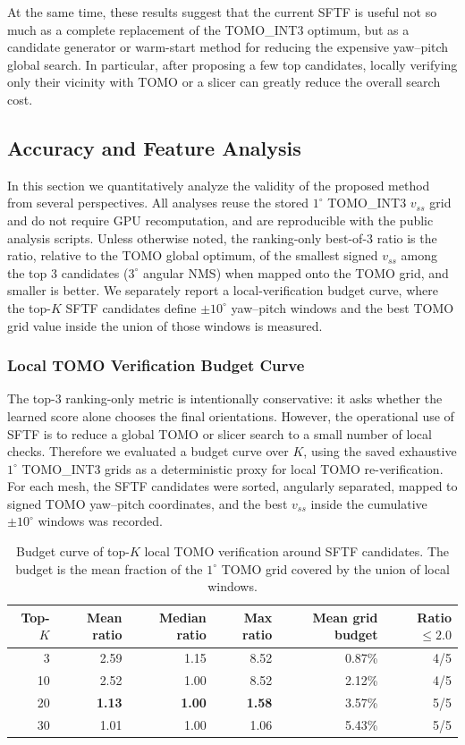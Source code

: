 \documentclass[11pt,a4paper]{article}
\begin{document}
At the same time, these results suggest that the current SFTF is useful not so much as a complete replacement of the TOMO\_INT3 optimum,
but as a candidate generator or warm-start method for reducing the expensive yaw--pitch global search.
In particular, after proposing a few top candidates,
locally verifying only their vicinity with TOMO or a slicer can greatly reduce the overall search cost.

\subsection{Accuracy and Feature Analysis}

In this section we quantitatively analyze the validity of the proposed method from several perspectives.
All analyses reuse the stored $1^\circ$ TOMO\_INT3 $v_{ss}$ grid and do not require GPU recomputation,
and are reproducible with the public analysis scripts.
Unless otherwise noted, the ranking-only best-of-3 ratio is the ratio, relative to the TOMO global optimum, of the smallest signed $v_{ss}$
among the top 3 candidates ($3^\circ$ angular NMS) when mapped onto the TOMO grid, and smaller is better.
We separately report a local-verification budget curve, where the top-$K$ SFTF candidates define $\pm 10^\circ$ yaw--pitch windows
and the best TOMO grid value inside the union of those windows is measured.

\subsubsection{Local TOMO Verification Budget Curve}
\label{sec:budget-curve}

The top-3 ranking-only metric is intentionally conservative: it asks whether the learned score alone chooses the final orientations.
However, the operational use of SFTF is to reduce a global TOMO or slicer search to a small number of local checks.
Therefore we evaluated a budget curve over $K$, using the saved exhaustive $1^\circ$ TOMO\_INT3 grids as a deterministic proxy for local TOMO re-verification.
For each mesh, the SFTF candidates were sorted, angularly separated, mapped to signed TOMO yaw--pitch coordinates,
and the best $v_{ss}$ inside the cumulative $\pm 10^\circ$ windows was recorded.

\begin{table}[H]
\centering
\caption{Budget curve of top-$K$ local TOMO verification around SFTF candidates.
The budget is the mean fraction of the $1^\circ$ TOMO grid covered by the union of local windows.}
\label{tab:budget-curve}
\begin{tabular}{rrrrrr}
\toprule
Top-$K$ & Mean ratio & Median ratio & Max ratio & Mean grid budget & Ratio $\le 2.0$\\
\midrule
3  & 2.59 & 1.15 & 8.52 & 0.87\% & 4/5\\
10 & 2.52 & 1.00 & 8.52 & 2.12\% & 4/5\\
20 & \textbf{1.13} & \textbf{1.00} & \textbf{1.58} & 3.57\% & 5/5\\
30 & 1.01 & 1.00 & 1.06 & 5.43\% & 5/5\\
\bottomrule
\end{tabular}
\end{table}
\end{document}
